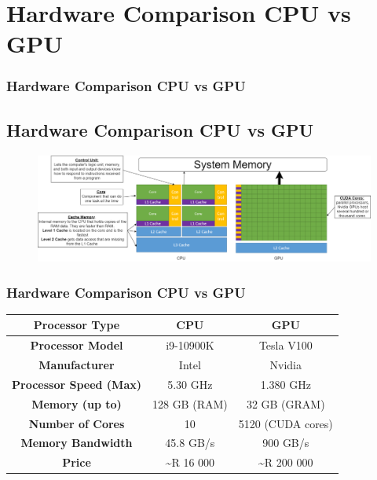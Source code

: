 \documentclass[11pt]{beamer}
\begin{document}
\section{Hardware Comparison CPU vs GPU}
\begin{frame}
	\frametitle{Hardware Comparison CPU vs GPU}
	\subsection{Hardware Comparison CPU vs GPU}
	\begin{figure}
		\includegraphics[width=\textwidth,height=\textheight,keepaspectratio]{cpu_vs_gpu}
	\end{figure}
\end{frame}

\begin{frame}
	\frametitle{Hardware Comparison CPU vs GPU}
	\begin{center}
		\begin{tabular}{| c | c | c |}
			\hline
			\textbf{Processor Type} & \textbf{CPU} & \textbf{GPU} \\ 
			\hline
			\textbf{Processor Model} & i9-10900K & Tesla V100 \\  
			\textbf{Manufacturer} & Intel & Nvidia  \\
			\textbf{Processor Speed (Max)} & 5.30 GHz & 1.380 GHz  \\
			\textbf{Memory (up to)} & 128 GB (RAM) & 32 GB (GRAM) \\
			\textbf{Number of Cores} & 10 & 5120 (CUDA cores) \\
			\textbf{Memory Bandwidth} & 45.8 GB/s & 900 GB/s\\
			\textbf{Price} & \textasciitilde R 16 000 & \textasciitilde R 200 000\\
			\hline  
		\end{tabular}
	\end{center}
\end{frame}
\end{document}
